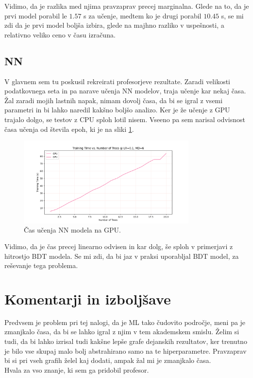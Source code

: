 \documentclass[a4paper]{article}
\begin{document}
Vidimo, da je razlika med njima pravzaprav precej marginalna. Glede na to, da je prvi model porabil le $1.57$ s za učenje,
medtem ko je drugi porabil $10.45$ s, se mi zdi da je prvi model boljša izbira, glede na majhno razliko v uspešnosti, a relativno 
veliko ceno v času izračuna.
\subsection{NN}
V glavnem sem tu poskusil rekreirati profesorjeve rezultate. Zaradi velikosti podatkovnega seta in pa narave 
učenja NN modelov, traja učenje kar nekaj časa. Žal zaradi mojih lastnih napak, nimam dovolj časa, da bi se 
igral z vsemi parametri in bi lahko naredil kakšno boljšo analizo. Ker je že učenje z GPU trajalo dolgo, 
se testov z CPU sploh lotil nisem. Vseeno pa sem narisal odvisnost časa učenja od števila epoh, ki je na sliki
\ref{fig:NN_times}. \\

\begin{figure}[H]
    \centering
    \includegraphics[width=0.8\textwidth]{../images/NNraw_performance.png}
    \caption{Čas učenja NN modela na GPU.}
    \label{fig:NN_times}
\end{figure}

Vidimo, da je čas precej linearno odvisen in kar dolg, še sploh v primerjavi z hitrostjo BDT modela. Se mi zdi,
da bi jaz v praksi uporabljal BDT model, za reševanje tega problema.


\section{Komentarji in izboljšave}
Predvsem je problem pri tej nalogi, da je ML tako čudovito področje, meni pa je zmanjkalo časa, da bi se lahko
igral z njim v tem akademskem smislu. Želim si tudi, da bi lahko izrisal tudi kakšne lepše grafe dejanskih
rezultatov, ker trenutno je bilo vse skupaj malo bolj abstrahirano samo na te hiperparametre. Pravzaprav 
bi si pri vseh grafih želel kaj dodati, ampak žal mi je zmanjkalo časa. \\

Hvala za vso znanje, ki sem ga pridobil profesor. \\

\newpage


\end{document}

